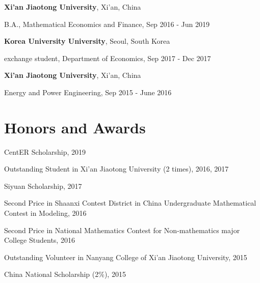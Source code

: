 \documentclass[margin,line]{res}
\newenvironment{list1}{
  \begin{list}{\ding{113}}{%
      \setlength{\itemsep}{0in}
      \setlength{\parsep}{0in} \setlength{\parskip}{0in}
      \setlength{\topsep}{0in} \setlength{\partopsep}{0in} 
      \setlength{\leftmargin}{0.17in}}}{\end{list}}
\begin{document}
\begin{resume}
{\bf Xi'an Jiaotong University}, Xi'an, China\\
\vspace*{-.1in}
\begin{list1}
\item[] B.A., Mathematical Economics and Finance, Sep 2016 - Jun 2019
\end{list1}

{\bf Korea University University}, Seoul, South Korea\\
\vspace*{-.1in}
\begin{list1}
\item[] exchange student, Department of Economics, Sep 2017 - Dec 2017
\end{list1}

{\bf Xi'an Jiaotong University}, Xi'an, China\\
\vspace*{-.1in}
\begin{list1}
\item[] Energy and Power Engineering, Sep 2015 - June 2016
\end{list1}

\section{\sc Honors and Awards} 
CentER Scholarship, 2019
\vspace*{-2.5mm}

Outstanding Student in Xi'an Jiaotong University (2 times), 2016, 2017
\vspace*{-2.5mm}

Siyuan Scholarship, 2017
\vspace*{-2.5mm}

Second Price in Shaanxi Contest District in China Undergraduate Mathematical Contest in Modeling, 2016
\vspace*{-2.5mm}

Second Price in National Mathematics Contest for Non-mathematics major College Students, 2016
\vspace*{-2.5mm}

Outstanding Volunteer in Nanyang College of Xi'an Jiaotong University, 2015
\vspace*{-2.5mm}

China National Scholarship (2\%), 2015


\end{resume}
\end{document}
